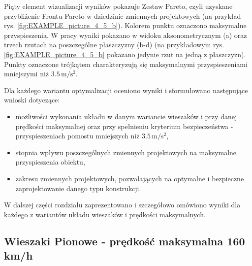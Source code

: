Piąty element wizualizacji wyników pokazuje Zestaw Pareto, czyli uzyskane przybliżenie Frontu Pareto w dziedzinie zmiennych projektowych (na przykład rys. \ref{fig:EXAMPLE_picture_4_5_b}). Kolorem punktu oznaczono maksymalne przyspieszenia. W pracy wyniki pokazano w widoku aksonometrycznym (a) oraz trzech rzutach na poszczególne płaszczyzny (b-d) (na przykładowym rys. \ref{fig:EXAMPLE_picture_4_5_b} pokazano jedynie rzut na jedną z płaszczyzn). Punkty oznaczone trójkątem charakteryzują się maksymalnymi przyspieszeniami mniejszymi niż $3.5\,\mathrm{m/s^2}$.

Dla każdego wariantu optymalizacji oceniono wyniki i sformułowano następujące wnioski dotyczące:
\begin{itemize}[noitemsep]
	\item możliwości wykonania układu w danym wariancie wieszaków i przy danej prędkości maksymalnej oraz przy spełnieniu kryterium bezpieczeństwa - przyspieszeniach pomostu mniejszych niż $3.5\,\mathrm{m/s^2}$,
	\item stopnia wpływu poszczególnych zmiennych projektowych na maksymalne przyspieszenia obiektu,
	\item zakresu zmiennych projektowych, pozwalających na optymalne i bezpieczne zaprojektowanie danego typu konstrukcji.
\end{itemize} 

W dalszej części rozdziału zaprezentowano i szczegółowo omówiono wyniki dla każdego z wariantów układu wieszaków i prędkości maksymalnych.

\clearpage
\subsection{Wieszaki Pionowe - prędkość maksymalna 160 km/h}

